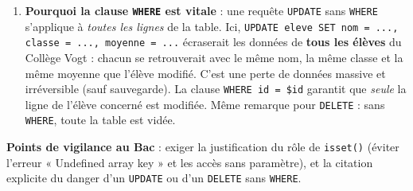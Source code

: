 \documentclass[11pt]{article}
\begin{document}
\begin{corrige}
\begin{enumerate}
\begin{lstlisting}[language=Php]
        // Attention : en production, échapper $nom et $classe
        // avec mysqli_real_escape_string($cnx, $nom) etc.
        // ou utiliser des requêtes préparées (PDO/mysqli).
        $sql = "UPDATE eleve
                SET nom = '$nom', classe = '$classe',
                    moyenne = $moyenne
                WHERE id = $id";
        $ok = mysqli_query($cnx, $sql);

        if ($ok) {
            echo "Les informations de l'élève ont été mises à jour.";
        } else {
            echo "Erreur lors de la mise à jour.";
        }
        mysqli_close($cnx);
    }
?>
\end{lstlisting}
\item \textbf{Pourquoi la clause \texttt{WHERE} est vitale} : une requête \texttt{UPDATE} sans \texttt{WHERE} s'applique à \emph{toutes les lignes} de la table. Ici, \texttt{UPDATE eleve SET nom = ..., classe = ..., moyenne = ...} écraserait les données de \textbf{tous les élèves} du Collège Vogt : chacun se retrouverait avec le même nom, la même classe et la même moyenne que l'élève modifié. C'est une perte de données massive et irréversible (sauf sauvegarde). La clause \texttt{WHERE id = \$id} garantit que \emph{seule} la ligne de l'élève concerné est modifiée. Même remarque pour \texttt{DELETE} : sans \texttt{WHERE}, toute la table est vidée.
\end{enumerate}
\textbf{Points de vigilance au Bac} : exiger la justification du rôle de \texttt{isset()} (éviter l'erreur « Undefined array key » et les accès sans paramètre), et la citation explicite du danger d'un \texttt{UPDATE} ou d'un \texttt{DELETE} sans \texttt{WHERE}.
\end{corrige}
\end{document}
